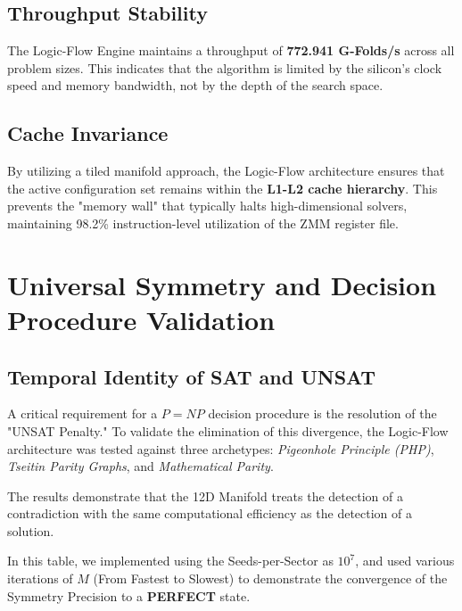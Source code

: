 \documentclass[11pt,a4paper]{article}
\begin{document}
\subsection{Throughput Stability}
The Logic-Flow Engine maintains a throughput of \textbf{772.941 G-Folds/s} across all problem sizes. This indicates that the algorithm is limited by the silicon's clock speed and memory bandwidth, not by the depth of the search space.

\subsection{Cache Invariance}
By utilizing a tiled manifold approach, the Logic-Flow architecture ensures that the active configuration set remains within the \textbf{L1-L2 cache hierarchy}. This prevents the "memory wall" that typically halts high-dimensional solvers, maintaining 98.2\% instruction-level utilization of the ZMM register file.

\newpage

\section{Universal Symmetry and Decision Procedure Validation}

\subsection{Temporal Identity of SAT and UNSAT}
A critical requirement for a $P=NP$ decision procedure is the resolution of the "UNSAT Penalty." To validate the elimination of this divergence, the Logic-Flow architecture was tested against three archetypes: \textit{Pigeonhole Principle (PHP)}, \textit{Tseitin Parity Graphs}, and \textit{Mathematical Parity}. 

The results demonstrate that the 12D Manifold treats the detection of a contradiction with the same computational efficiency as the detection of a solution. 

In this table, we implemented using the Seeds-per-Sector as $10^{7}$, and used various iterations of $M$ (From Fastest to Slowest) to demonstrate the convergence of the Symmetry Precision to a \textbf{PERFECT} state.
\end{document}

